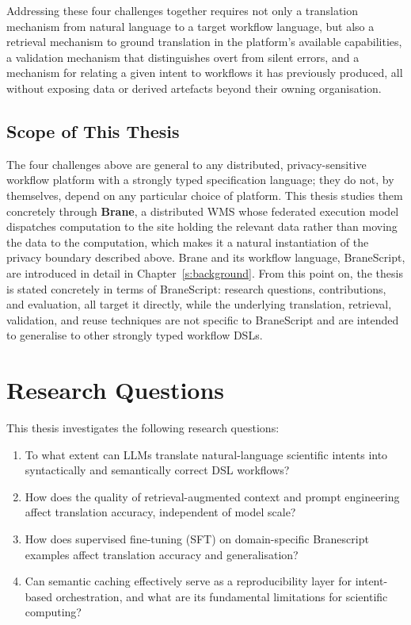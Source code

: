 Addressing these four challenges together requires not only a translation
mechanism from natural language to a target workflow language, but also a
retrieval mechanism to ground translation in the platform's available
capabilities, a validation mechanism that distinguishes overt from silent
errors, and a mechanism for relating a given intent to workflows it has
previously produced, all without exposing data or derived artefacts beyond
their owning organisation. 

\subsection{Scope of This Thesis}

The four challenges above are general to any distributed, privacy-sensitive
workflow platform with a strongly typed specification language; they do not,
by themselves, depend on any particular choice of platform. This thesis
studies them concretely through \textbf{Brane}, a distributed WMS whose
federated execution model dispatches computation to the site holding the
relevant data rather than moving the data to the computation, which makes it
a natural instantiation of the privacy boundary described above. Brane and its
workflow language, BraneScript, are introduced in detail in
Chapter~\ref{s:background}. From this point on, the thesis is stated
concretely in terms of BraneScript: research questions, contributions,
and evaluation, all target it directly, while the underlying translation,
retrieval, validation, and reuse techniques are not specific to BraneScript
and are intended to generalise to other strongly typed workflow DSLs.

\section{Research Questions}

This thesis investigates the following research questions:

\begin{enumerate}
    \item[\rqref{1}]\label{rq:1} To what extent can LLMs translate natural-language
        scientific intents into syntactically and semantically correct
        DSL workflows?
    \item[\rqref{2}]\label{rq:2} How does the quality of retrieval-augmented context and
        prompt engineering affect translation accuracy, independent of model
        scale?
    \item[\rqref{3}]\label{rq:3} How does supervised fine-tuning (SFT) on domain-specific 
        Branescript examples affect translation accuracy and generalisation?    
    \item[\rqref{4}]\label{rq:4} Can semantic caching effectively serve as a
        reproducibility layer for intent-based orchestration, and what are its
        fundamental limitations for scientific computing?
\end{enumerate}

